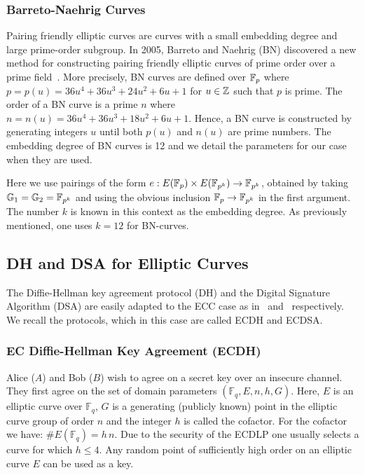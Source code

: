 \subsubsection{Barreto-Naehrig Curves}

Pairing friendly elliptic curves are curves with a small embedding degree and
large prime-order subgroup. In 2005, Barreto and Naehrig (BN) discovered a new
method for constructing pairing friendly elliptic curves of prime order over a
prime field~\cite{BN06}. More precisely, BN curves are defined over $\mathbb{F}_{p}$
where $p = p(u) = 36 u^4 + 36 u^3 + 24 u^2 + 6 u + 1$ for $u \in \mathbb{Z}$ such that
$p$ is prime. The order of a BN curve is a prime $n$ where
$n = n(u) = 36 u^4 + 36 u^3 + 18 u^2 + 6 u + 1$. Hence, a BN curve is
constructed by generating integers $u$ until both $p(u)$ and $n(u)$ are prime
numbers. The embedding degree of BN curves is 12 and we detail the parameters
for our case when they are used.

Here we use pairings of the form $e: E(\mathbb{F}_{p}) \times E(\mathbb{F}_{p^k}) \to \mathbb{F}_{p^k}$,
obtained by taking $\mathbb{G}_{1} = \mathbb{G}_{2} = \mathbb{F}_{p^k}$ and using the obvious inclusion
$\mathbb{F}_{p} \to \mathbb{F}_{p^k}$ in the first argument. The number $k$ is known in this
context as the embedding degree. As previously mentioned, one uses $k = 12$ for
BN-curves.

\subsection{DH and DSA for Elliptic Curves}\label{sec:dhdsa}

The Diffie-Hellman key agreement protocol (DH) and the Digital Signature
Algorithm (DSA) are easily adapted to the ECC case as in~\cite{BSS05}
and~\cite{JM00} respectively. We recall the protocols, which in this case are
called ECDH and ECDSA.

\subsubsection{EC Diffie-Hellman Key Agreement (ECDH)}

Alice ($A$) and Bob ($B$) wish to agree on a
secret key over an insecure channel. They first agree on the set
of domain parameters $(\mathbb{F}_q, E, n,
h, G)$. Here, $E$ is an elliptic curve over
$\mathbb{F}_q$, $G$ is a generating (publicly known) point in
the elliptic curve group of order $n$ and the integer
$h$ is called the cofactor. For the cofactor we have:
$\# E(\mathbb{F}_q) = h \, n.$
Due to the security of the ECDLP one usually
selects a curve for which $h \leq 4$.
Any random point of sufficiently high order on
an elliptic curve $E$ can be used as a key.


